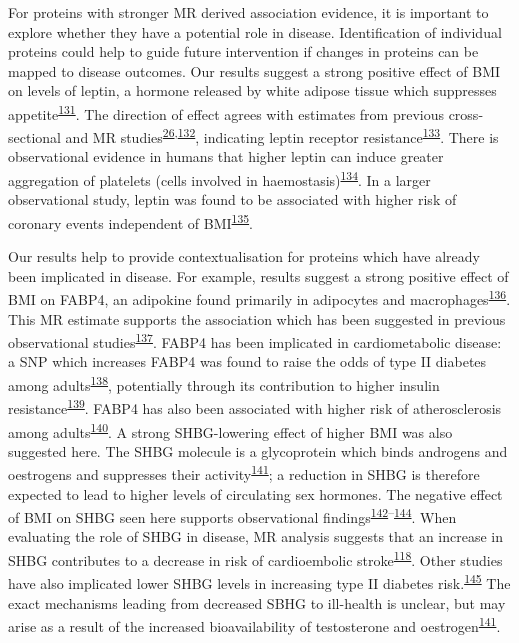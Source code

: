 \documentclass[11pt,twoside]{bristolthesis}
\begin{document}
For proteins with stronger MR derived association evidence, it is important to explore whether they have a potential role in disease. Identification of individual proteins could help to guide future intervention if changes in proteins can be mapped to disease outcomes. Our results suggest a strong positive effect of BMI on levels of leptin, a hormone released by white adipose tissue which suppresses appetite\textsuperscript{\protect\hyperlink{ref-Klok2007}{131}}. The direction of effect agrees with estimates from previous cross-sectional and MR studies\textsuperscript{\protect\hyperlink{ref-Wurtz2014}{26},\protect\hyperlink{ref-Millard2015}{132}}, indicating leptin receptor resistance\textsuperscript{\protect\hyperlink{ref-Gruzdeva2019a}{133}}. There is observational evidence in humans that higher leptin can induce greater aggregation of platelets (cells involved in haemostasis)\textsuperscript{\protect\hyperlink{ref-Nakata1999}{134}}. In a larger observational study, leptin was found to be associated with higher risk of coronary events independent of BMI\textsuperscript{\protect\hyperlink{ref-Wallace2001}{135}}.

Our results help to provide contextualisation for proteins which have already been implicated in disease. For example, results suggest a strong positive effect of BMI on FABP4, an adipokine found primarily in adipocytes and macrophages\textsuperscript{\protect\hyperlink{ref-Furuhashi2014}{136}}. This MR estimate supports the association which has been suggested in previous observational studies\textsuperscript{\protect\hyperlink{ref-Xu2006}{137}}. FABP4 has been implicated in cardiometabolic disease: a SNP which increases FABP4 was found to raise the odds of type II diabetes among adults\textsuperscript{\protect\hyperlink{ref-Gudmundsdottir2020}{138}}, potentially through its contribution to higher insulin resistance\textsuperscript{\protect\hyperlink{ref-Nakamura2017}{139}}. FABP4 has also been associated with higher risk of atherosclerosis among adults\textsuperscript{\protect\hyperlink{ref-Yeung2007}{140}}. A strong SHBG-lowering effect of higher BMI was also suggested here. The SHBG molecule is a glycoprotein which binds androgens and oestrogens and suppresses their activity\textsuperscript{\protect\hyperlink{ref-Wallace2013}{141}}; a reduction in SHBG is therefore expected to lead to higher levels of circulating sex hormones. The negative effect of BMI on SHBG seen here supports observational findings\textsuperscript{\protect\hyperlink{ref-Cooper2015}{142}--\protect\hyperlink{ref-Baglietto2009}{144}}. When evaluating the role of SHBG in disease, MR analysis suggests that an increase in SHBG contributes to a decrease in risk of cardioembolic stroke\textsuperscript{\protect\hyperlink{ref-Zheng2020}{118}}. Other studies have also implicated lower SHBG levels in increasing type II diabetes risk.\textsuperscript{\protect\hyperlink{ref-Ritchie2019}{145}} The exact mechanisms leading from decreased SBHG to ill-health is unclear, but may arise as a result of the increased bioavailability of testosterone and oestrogen\textsuperscript{\protect\hyperlink{ref-Wallace2013}{141}}.
\end{document}
